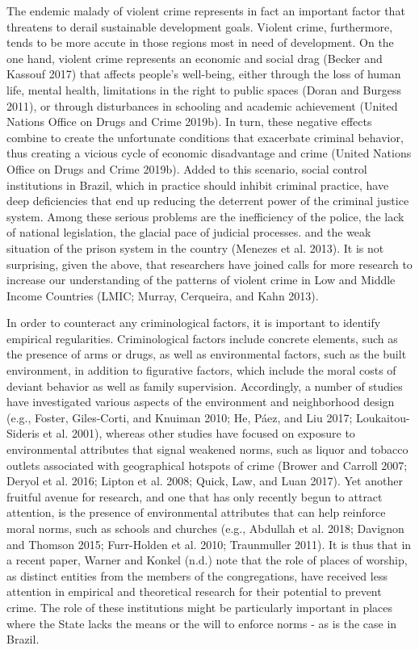 \documentclass[smallextended]{svjour3}       %
\begin{document}
The endemic malady of violent crime represents in fact an important
factor that threatens to derail sustainable development goals. Violent
crime, furthermore, tends to be more accute in those regions most in
need of development. On the one hand, violent crime represents an
economic and social drag (Becker and Kassouf 2017) that affects people's
well-being, either through the loss of human life, mental health,
limitations in the right to public spaces (Doran and Burgess 2011), or
through disturbances in schooling and academic achievement (United
Nations Office on Drugs and Crime 2019b). In turn, these negative
effects combine to create the unfortunate conditions that exacerbate
criminal behavior, thus creating a vicious cycle of economic
disadvantage and crime (United Nations Office on Drugs and Crime 2019b).
Added to this scenario, social control institutions in Brazil, which in
practice should inhibit criminal practice, have deep deficiencies that
end up reducing the deterrent power of the criminal justice system.
Among these serious problems are the inefficiency of the police, the
lack of national legislation, the glacial pace of judicial processes.
and the weak situation of the prison system in the country (Menezes et
al. 2013). It is not surprising, given the above, that researchers have
joined calls for more research to increase our understanding of the
patterns of violent crime in Low and Middle Income Countries (LMIC;
Murray, Cerqueira, and Kahn 2013).

In order to counteract any criminological factors, it is important to
identify empirical regularities. Criminological factors include concrete
elements, such as the presence of arms or drugs, as well as
environmental factors, such as the built environment, in addition to
figurative factors, which include the moral costs of deviant behavior as
well as family supervision. Accordingly, a number of studies have
investigated various aspects of the environment and neighborhood design
(e.g., Foster, Giles-Corti, and Knuiman 2010; He, Páez, and Liu 2017;
Loukaitou-Sideris et al. 2001), whereas other studies have focused on
exposure to environmental attributes that signal weakened norms, such as
liquor and tobacco outlets associated with geographical hotspots of
crime (Brower and Carroll 2007; Deryol et al. 2016; Lipton et al. 2008;
Quick, Law, and Luan 2017). Yet another fruitful avenue for research,
and one that has only recently begun to attract attention, is the
presence of environmental attributes that can help reinforce moral
norms, such as schools and churches (e.g., Abdullah et al. 2018;
Davignon and Thomson 2015; Furr-Holden et al. 2010; Traunmuller 2011).
It is thus that in a recent paper, Warner and Konkel (n.d.) note that
the role of places of worship, as distinct entities from the members of
the congregations, have received less attention in empirical and
theoretical research for their potential to prevent crime. The role of
these institutions might be particularly important in places where the
State lacks the means or the will to enforce norms - as is the case in
Brazil.
\end{document}
